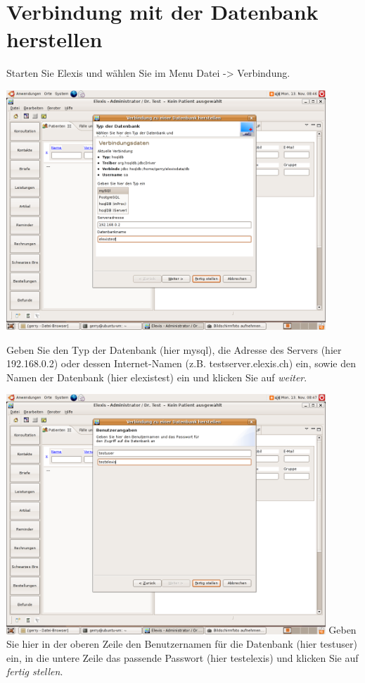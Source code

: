 \section{Verbindung mit der Datenbank herstellen}
\label{connect}
Starten Sie Elexis und wählen Sie im Menu Datei -> Verbindung.

\includegraphics[width=0.9\textwidth]{images/verbindung11.png}



Geben Sie den Typ der Datenbank (hier mysql), die Adresse des Servers (hier 192.168.0.2) oder dessen Internet-Namen
(z.B. testserver.elexis.ch) ein, sowie den Namen der Datenbank (hier  elexistest) ein und klicken Sie auf
\textit{weiter}.

\includegraphics[width=0.9\textwidth]{images/verbindung12.png}
Geben Sie hier in der oberen Zeile den Benutzernamen für die Datenbank (hier testuser) ein, in die untere Zeile das passende Passwort (hier testelexis) und klicken Sie auf \textit{fertig stellen}.

